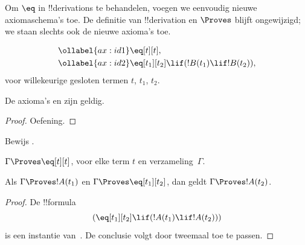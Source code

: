 \documentclass[../../../include/open-logic-section]{subfiles}
\begin{document}


Om $\eq$ in !!{derivation}s te behandelen, voegen we eenvoudig nieuwe
axiomaschema's toe. De definitie van !!{derivation} en $\Proves$ blijft
ongewijzigd; we staan slechts ook de nieuwe axioma's toe.

\begin{defn}
\begin{align}
\ollabel{ax:id1} & \eq[t][t], \\
\ollabel{ax:id2} & \eq[t_1][t_2] \lif (!B(t_1) \lif
  !B(t_2)),
\end{align}
voor willekeurige gesloten termen $t$, $t_1$, $t_2$.
\end{defn}

\begin{prop}
  De axioma's  en  zijn geldig.
\end{prop}

\begin{proof}
  Oefening.
\end{proof}

\begin{prob}
Bewijs .
\end{prob}

\begin{prop}
 $\Gamma \Proves \eq[t][t]$, voor elke term $t$ en
 verzameling~$\Gamma$.
\end{prop}

\begin{prop}
  Als $\Gamma \Proves !A(t_1)$ en $\Gamma \Proves
  \eq[t_1][t_2]$, dan geldt $\Gamma \Proves !A(t_2)$.
\end{prop}

\begin{proof}
De !!{formula}
\[
(\eq[t_1][t_2] \lif (!A(t_1) \lif !A(t_2)))
\]
is een instantie van~. De conclusie volgt door
\MP{} tweemaal toe te passen.
\end{proof}
\end{document}
